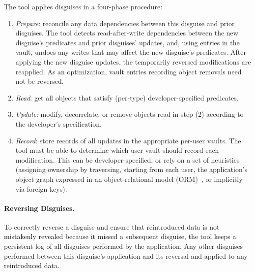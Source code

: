 The tool applies disguises in a four-phase procedure:
\begin{enumerate}
    \item \emph{Prepare}: reconcile any data dependencies between this disguise and prior disguises.
            The tool detects read-after-write dependencies between the new disguise's predicates and prior disguises'
            updates, and, using entries in the vault, undoes any writes that may affect the new disguise's predicates. After
            applying the new disguise updates, the temporarily reversed modifications are reapplied. As an
            optimization, vault entries recording object removals need not be reversed.
        \item \emph{Read}: get all objects that satisfy (per-type) developer-specified predicates.
        \item \emph{Update}: modify, decorrelate, or remove objects read in step (2) according to the
        developer's specification.
    \item \emph{Record}: store records of all updates in the appropriate per-user vaults. The tool
        must be able to determine which user vault should record each modification. This can be
        developer-specified, or rely on a set of heuristics (\eg assigning ownership by traversing,
        starting from each user, the application's object graph expressed in an object-relational
        model (ORM)~\cite{orm}, or implicitly via foreign keys). 
\end{enumerate}

\paragraph{Reversing Disguises.}
To correctly reverse a disguise and ensure that reintroduced data is not mistakenly revealed because
it missed a subsequent disguise, the tool keeps a persistent log of all disguises performed by the 
application. Any other disguises performed between this disguise's application and its reversal and
applied to any reintroduced data.
